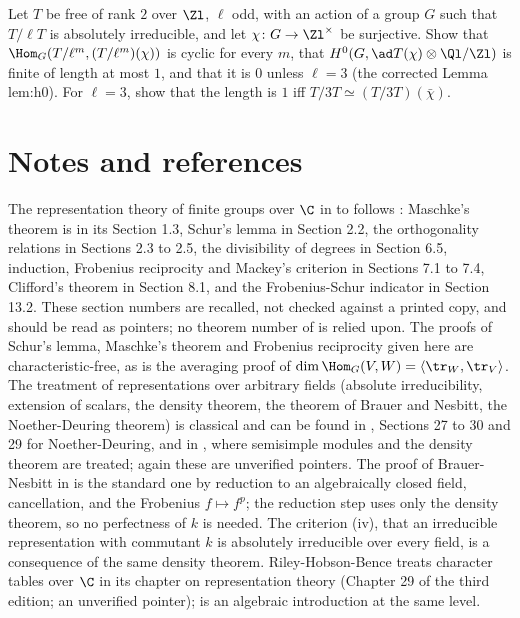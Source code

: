 \begin{exercise}\label{ex:reps:ex17}
Let $T$ be free of rank $2$ over $\Zl$, $\ell$ odd, with an action of a group $G$ such that $T/\ell T$ is absolutely irreducible, and let $\chi\colon G\to\Zl^\times$ be
surjective. Show that $\Hom_G(T/\ell^m,(T/\ell^m)(\chi))$ is cyclic for every $m$, that $H^0(G,\ad T(\chi)\otimes\Ql/\Zl)$ is finite of length at most $1$, and that
it is $0$ unless $\ell=3$ (the corrected Lemma lem:h0). For $\ell=3$, show that the length is $1$ iff $T/3T\simeq(T/3T)(\bar\chi)$.
\end{exercise}

\section{Notes and references}\label{sec:reps:notes}

The representation theory of finite groups over $\C$ in  to  follows \cite{SerreLinearReps}: Maschke's
theorem is in its Section 1.3, Schur's lemma in Section 2.2, the orthogonality relations in Sections 2.3 to 2.5, the divisibility of
degrees in Section 6.5, induction, Frobenius reciprocity and Mackey's criterion in Sections 7.1 to 7.4, Clifford's theorem in Section 8.1,
and the Frobenius-Schur indicator in Section 13.2. These section numbers are recalled, not checked against a printed copy, and should be
read as pointers; no theorem number of \cite{SerreLinearReps} is relied upon. The proofs of Schur's lemma, Maschke's theorem and
Frobenius reciprocity given here are characteristic-free, as is the averaging proof of $\dim\Hom_G(V,W)=\langle\tr_W,\tr_V\rangle$. The treatment of
representations over arbitrary fields (absolute irreducibility, extension of scalars, the density theorem, the theorem of Brauer and
Nesbitt, the Noether-Deuring theorem) is classical and can be found in \cite{CurtisReiner}, Sections 27 to 30 and 29 for Noether-Deuring,
and in \cite[Chapter XVII]{Lang}, where semisimple modules and the density theorem are treated; again these are unverified pointers.
The proof of Brauer-Nesbitt in  is the standard one by reduction to an algebraically closed field, cancellation, and
the Frobenius $f\mapsto f^p$; the reduction step uses only the density theorem, so no perfectness of $k$ is needed. The criterion
(iv), that an irreducible representation with commutant $k$ is absolutely irreducible over every field, is a
consequence of the same density theorem. Riley-Hobson-Bence \cite{RHB06} treats character tables over $\C$ in its chapter on representation
theory (Chapter 29 of the third edition; an unverified pointer); \cite[Chapter 18]{DummitFoote} is an algebraic introduction at the
same level.

